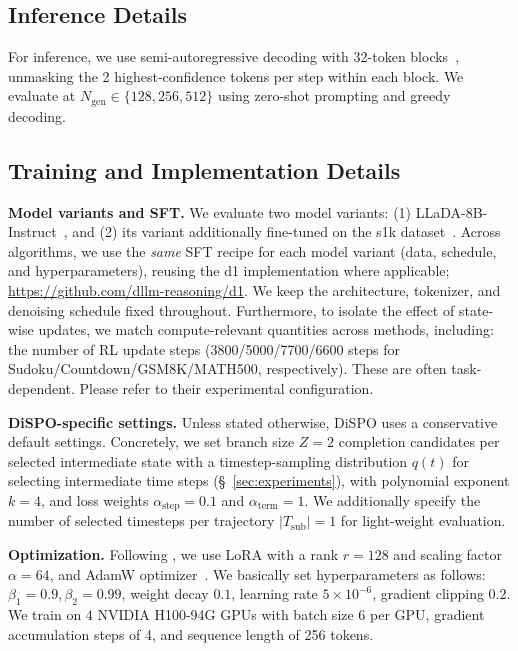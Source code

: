 \documentclass{article}
\theoremstyle{plain}
\theoremstyle{definition}
\theoremstyle{remark}
\begin{document}
\subsection{Inference Details}
\label{app:exp:inference}
For inference, we use semi-autoregressive decoding with 32-token blocks~\cite{arriolablock}, unmasking the 2 highest-confidence tokens per step within each block.
We evaluate at $N_{\text{gen}}\in\{128,256,512\}$ using zero-shot prompting and greedy decoding.


\subsection{Training and Implementation Details}
\label{app:exp:setting}

\textbf{Model variants and SFT.}
We evaluate two model variants:
(1) LLaDA-8B-Instruct~\citep{nie2025largelanguagediffusionmodels}, and
(2) its variant additionally fine-tuned on the s1k dataset~\citep{s1k}.
Across algorithms, we use the \emph{same} SFT recipe for each model variant (data, schedule, and hyperparameters), reusing the d1 implementation where applicable; \url{https://github.com/dllm-reasoning/d1}.
We keep the architecture, tokenizer, and denoising schedule fixed throughout.
Furthermore, to isolate the effect of state-wise updates, we match compute-relevant quantities across methods, including: the number of RL update steps (3800/5000/7700/6600 steps for Sudoku/Countdown/GSM8K/MATH500, respectively).
These are often task-dependent. Please refer to their experimental configuration.

\textbf{DiSPO-specific settings.}
Unless stated otherwise, DiSPO uses a conservative default settings.
Concretely, we set branch size $Z{=}2$ completion candidates per selected intermediate state with
a timestep-sampling distribution $q(t)$ for selecting intermediate time steps (\S~\ref{sec:experiments}), with polynomial exponent $k{=}4$, and loss weights $\alpha_{\text{step}}{=}0.1$ and $\alpha_{\text{term}}{=}1$.
We additionally specify the number of selected timesteps per trajectory $|T_{\text{sub}}|{=}1$ for light-weight evaluation. 

\textbf{Optimization.}
Following \citet{zhao2025d1},
we use LoRA with a rank $r=128$ and scaling factor $\alpha = 64$, and AdamW optimizer~\cite{}.
We basically set hyperparameters as follows: $\beta_1=0.9, \beta_2=0.99$, weight decay $0.1$, learning rate $5 \times 10^{-6}$, gradient clipping $0.2$. 
We train on $4$ NVIDIA H100-94G GPUs with batch size 6 per GPU, gradient accumulation steps of 4, and sequence length of 256 tokens. 
\end{document}
